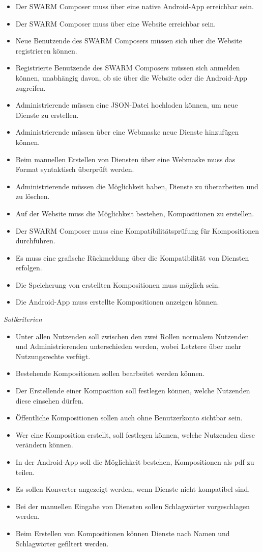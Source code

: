 \begin{itemize}[leftmargin=4pc]
	\item Der SWARM Composer muss über eine native Android-App erreichbar sein.
	\item Der SWARM Composer muss über eine Website erreichbar sein.
	\item Neue Benutzende des SWARM Composers müssen sich über die Website registrieren können.
	\item Registrierte Benutzende des SWARM Composers müssen sich anmelden können, unabhängig davon, ob sie über die Website oder die Android-App zugreifen.
	\item Administrierende müssen eine JSON-Datei hochladen können, um neue Dienste zu erstellen.
	\item Administrierende müssen über eine Webmaske neue Dienste hinzufügen können.
	\item Beim manuellen Erstellen von Diensten über eine Webmaske muss das Format syntaktisch überprüft werden.
	\item Administrierende müssen die Möglichkeit haben, Dienste zu überarbeiten und zu löschen.
	\item Auf der Website muss die Möglichkeit bestehen, Kompositionen zu erstellen.
	\item Der SWARM Composer muss eine Kompatibilitätsprüfung für Kompositionen durchführen.
	\item Es muss eine grafische Rückmeldung über die Kompatibilität von Diensten erfolgen.
	\item Die Speicherung von erstellten Kompositionen muss möglich sein.
	\item Die Android-App muss erstellte Kompositionen anzeigen können.
\end{itemize}

\textit{Sollkriterien}

\begin{itemize}[leftmargin=4pc]
	\item Unter allen Nutzenden soll zwischen den zwei Rollen normalem Nutzenden und Administrierenden unterschieden werden, wobei Letztere über mehr Nutzungsrechte verfügt.
	\item Bestehende Kompositionen sollen bearbeitet werden können.
	\item Der Erstellende einer Komposition soll festlegen können, welche Nutzenden diese einsehen dürfen.
	\item Öffentliche Kompositionen sollen auch ohne Benutzerkonto sichtbar sein.
	\item Wer eine Komposition erstellt, soll festlegen können, welche Nutzenden diese verändern können.
	\item In der Android-App soll die Möglichkeit bestehen, Kompositionen als pdf zu teilen.
	\item Es sollen Konverter angezeigt werden, wenn Dienste nicht kompatibel sind.
	\item Bei der manuellen Eingabe von Diensten sollen Schlagwörter vorgeschlagen werden.
	\item Beim Erstellen von Kompositionen können Dienste nach Namen und Schlagwörter gefiltert werden.
\end{itemize}

